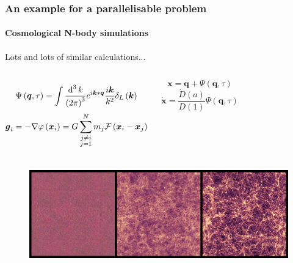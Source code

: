 \begin{frame}
\frametitle{An example for a parallelisable problem}
\framesubtitle{Cosmological N-body simulations}

\begin{block}{Lots and lots of similar calculations...}
	\begin{columns}
		\footnotesize
		\begin{equation*}
			\Psi \left( \boldsymbol{q}, \tau \right)
			=
			\int \frac{\operatorname{d}^{3}{k}}{\left( 2 \pi \right)^{3}}
			e^{i \boldsymbol{k} * \boldsymbol{q}}
			\frac{i \boldsymbol{k}}{k^{2}}
			\delta_{L} \left( \boldsymbol{k} \right)
		\end{equation*}
		\begin{equation*}
			\boldsymbol{g}_{i}
			=
			- \nabla \phi \left( \boldsymbol{x}_{i} \right)
			=
			G
			\sum_{\mathclap{\substack{
				j \neq i \\
				j = 1
			}}}^{N} m_{j} \mathcal{F} \left( \boldsymbol{x}_{i} - \boldsymbol{x}_{j} \right)
		\end{equation*}

		\begin{equation*}
			\boldsymbol{x}
			=
			\boldsymbol{q} + \Psi \left( \boldsymbol{q}, \tau \right)
		\end{equation*}
		\begin{equation*}
			\dot{\boldsymbol{x}}
			=
			\frac{\dot{D} \left( a \right)}{D \left( 1 \right)} \Psi \left( \boldsymbol{q}, \tau \right)
		\end{equation*}
	\end{columns}
\end{block}

\begin{figure}
	\includegraphics[width=\textwidth]{img/shaded_evolution_N65536_M2_L200_noframe.jpg}
\end{figure}

\end{frame}